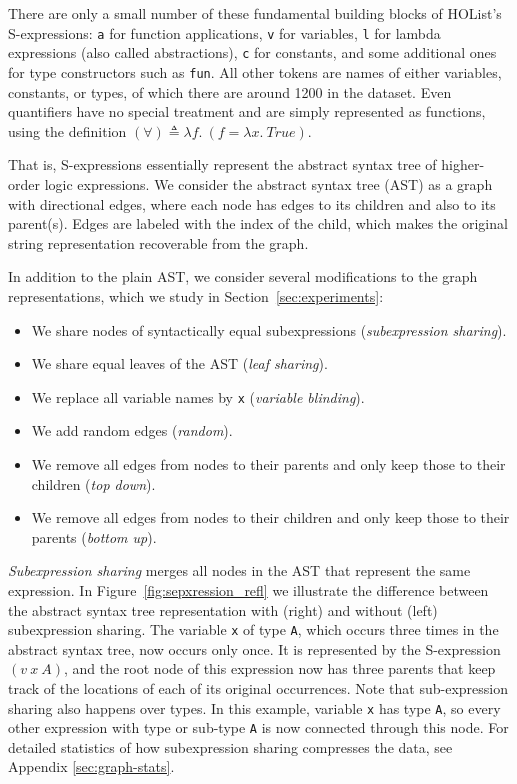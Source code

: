 \documentclass[letterpaper]{article} \usepackage{aaai20}  \usepackage{times}  \usepackage{helvet} \usepackage{courier}  \usepackage[hyphens]{url}  \usepackage{graphicx} \urlstyle{rm} \def\UrlFont{\rm}  \usepackage{graphicx}  \frenchspacing  \setlength{\pdfpagewidth}{8.5in}  \setlength{\pdfpageheight}{11in}
\begin{document}
There are only a small number of these fundamental building blocks of HOList's S-expressions: \texttt{a} for function applications, \texttt{v} for variables, \texttt{l} for lambda expressions (also called abstractions), \texttt{c} for constants, and some additional ones for type constructors such as \texttt{fun}.
All other tokens are names of either variables, constants, or types, of which there are around 1200 in the dataset.
Even quantifiers have no special treatment and are simply represented as functions, using the definition $(\forall) \triangleq \lambda f.\: (f=\lambda x.\: \mathit{True})$.

That is, S-expressions essentially represent the abstract syntax tree of higher-order logic expressions.
We consider the abstract syntax tree (AST) as a graph with directional edges, where each node has edges to its children and also to its parent(s).
Edges are labeled with the index of the child, which makes the original string representation recoverable from the graph.

In addition to the plain AST, we consider several modifications to the graph representations, which we study in Section~\ref{sec:experiments}:
\begin{itemize}
\item We share nodes of syntactically equal subexpressions (\emph{subexpression sharing}).
\item We share equal leaves of the AST (\emph{leaf sharing}).
\item We replace all variable names by \texttt{x} (\emph{variable blinding}).
\item We add random edges (\emph{random}).
\item We remove all edges from nodes to their parents and only keep those to their children (\emph{top down}).
\item We remove all edges from nodes to their children and only keep those to their parents (\emph{bottom up}).
\end{itemize}

\emph{Subexpression sharing} merges all nodes in the AST that represent the same expression.
In Figure~\ref{fig:sepxression_refl} we illustrate the difference between the abstract syntax tree representation with (right) and without (left) subexpression sharing.
The variable \texttt{x} of type \texttt{A}, which occurs three times in the abstract syntax tree, now occurs only once.
It is represented by the S-expression $(v~x~A)$, and the root node of this expression now has three parents that keep track of the locations of each of its original occurrences.
Note that sub-expression sharing also happens over types.
In this example, variable \texttt{x} has type \texttt{A}, so every other expression with type or sub-type \texttt{A} is now connected through this node.
For detailed statistics of how subexpression sharing compresses the data, see Appendix \ref{sec:graph-stats}. 
\end{document}
